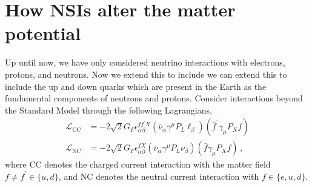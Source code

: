 \documentclass{thesis}
\begin{document}
\section{How NSIs alter the matter potential}
Up until now, we have only considered neutrino interactions with electrons, protons, and neutrons. Now we extend this to include we can extend this to include 
the up and down quarks which are present in the Earth as the fundamental components of neutrons and protons. 
Consider interactions beyond the Standard Model through the following Lagrangians,
\begin{align*}
    \mathcal{L}_{\mathrm{CC}} &= -2 \sqrt{2} G_{F} \epsilon_{\alpha \beta}^{f f^{\prime} X}\left(\bar{\nu}_{\alpha} \gamma^{\mu} P_{L} \ell_{\beta}\right)\left(\bar{f}^{\prime} \gamma_{\mu} P_{X} f\right) \\
    \mathcal{L}_{\mathrm{NC}} &= -2 \sqrt{2} G_{F} \epsilon_{\alpha \beta}^{f X}\left(\bar{\nu}_{\alpha} \gamma^{\mu} P_{L} \nu_{\beta}\right)\left(\bar{f} \gamma_{\mu} P_{X} f\right)\,,
\end{align*}
where CC denotes the charged current interaction with the matter field $f\neq f^\prime \in \{u,d\}$, and NC denotes the neutral current interaction with 
$f \in \{e,u,d\}$. 
\end{document}
